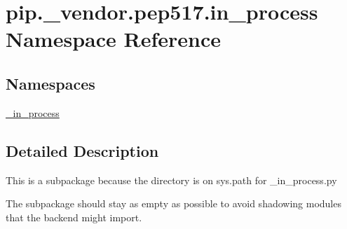 \hypertarget{namespacepip_1_1__vendor_1_1pep517_1_1in__process}{}\section{pip.\+\_\+vendor.\+pep517.\+in\+\_\+process Namespace Reference}
\label{namespacepip_1_1__vendor_1_1pep517_1_1in__process}
\subsection*{Namespaces}
\begin{DoxyCompactItemize}
\item 
 \hyperlink{namespacepip_1_1__vendor_1_1pep517_1_1in__process_1_1__in__process}{\+\_\+in\+\_\+process}
\end{DoxyCompactItemize}


\subsection{Detailed Description}
\begin{DoxyVerb}This is a subpackage because the directory is on sys.path for _in_process.py

The subpackage should stay as empty as possible to avoid shadowing modules that
the backend might import.
\end{DoxyVerb}
 